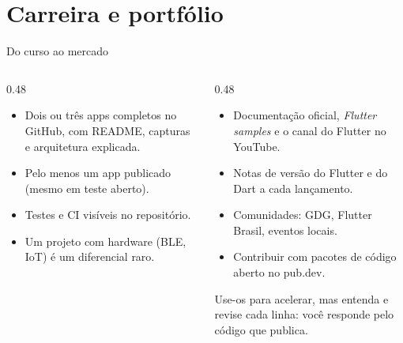 \documentclass[aspectratio=169,10pt]{beamer}
\begin{document}
\section{Carreira e portfólio}

\begin{frame}{Do curso ao mercado}
  \begin{columns}[T]
    \begin{column}{0.48\textwidth}
      \begin{conceito}
        \begin{itemize}
          \item Dois ou três apps completos no GitHub, com README, capturas e arquitetura explicada.
          \item Pelo menos um app publicado (mesmo em teste aberto).
          \item Testes e CI visíveis no repositório.
          \item Um projeto com hardware (BLE, IoT) é um diferencial raro.
        \end{itemize}
      \end{conceito}
    \end{column}
    \begin{column}{0.48\textwidth}
      \begin{dica}
        \begin{itemize}
          \item Documentação oficial, \emph{Flutter samples} e o canal do Flutter no YouTube.
          \item Notas de versão do Flutter e do Dart a cada lançamento.
          \item Comunidades: GDG, Flutter Brasil, eventos locais.
          \item Contribuir com pacotes de código aberto no pub.dev.
        \end{itemize}
      \end{dica}
      \begin{atencao}[Assistentes de IA]
        Use-os para acelerar, mas entenda e revise cada linha: você responde pelo código que publica.
      \end{atencao}
    \end{column}
  \end{columns}
\end{frame}

\end{document}
